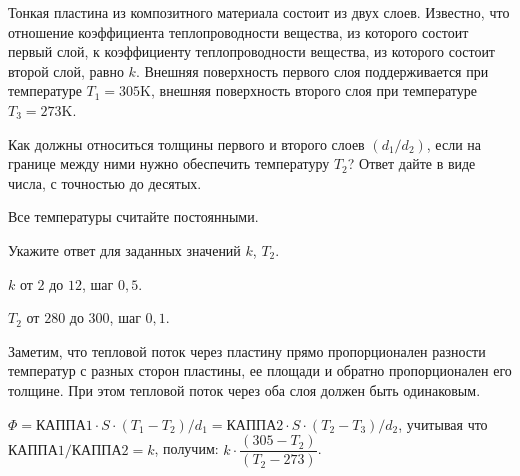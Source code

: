 
Тонкая пластина из композитного материала состоит из двух слоев. 
Известно, что отношение коэффициента теплопроводности вещества, из которого состоит первый слой, 
к коэффициенту теплопроводности вещества, из которого состоит второй слой, равно $k$. 
Внешняя поверхность первого слоя поддерживается при температуре \linebreak $T_1 = 305$K, внешняя поверхность 
второго слоя при температуре $T_3 = 273$K. 

Как должны относиться толщины первого и второго слоев $(d_1 / d_2)$, если на границе между ними нужно 
обеспечить температуру $T_2$? Ответ дайте в виде числа, с точностью до десятых. 

Все температуры считайте постоянными.

Укажите ответ для заданных значений $k$, $T_2$.

\paramSection

$k$ от $2$ до $12$, шаг $0,5$.

$T_2$ от $280$ до $300$, шаг $0,1$.

\soultionSection

Заметим, что тепловой поток через пластину прямо пропорционален разности температур с разных сторон пластины, 
ее площади и обратно пропорционален его толщине. При этом тепловой поток через оба слоя должен быть одинаковым.

$\Phi= \text{КАППА1} \cdot S \cdot (T_1-T_2)/d_1 = \text{КАППА2} \cdot S \cdot (T_2-T_3)/d_2$, учитывая что $\text{КАППА1}/ \text{КАППА2} = k$, получим: $k \cdot \dfrac{(305-T_2)}{(T_2-273)}$.

